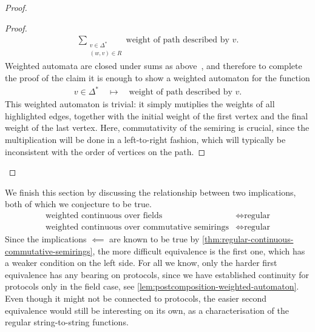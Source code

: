 \begin{proof}
\begin{proof}
\begin{align*}
    \sum_{\substack{v \in \Delta^* \\ (w,v) \in R}} \text{weight of path described by $v$}.
    \end{align*} 
    Weighted automata are closed under sums as above~\cite[Lemma 8.12]{bojanczyk_automata_2025}, and therefore to complete the proof of the claim it is enough to show a weighted automaton for the function
    \begin{align*}
    v \in \Delta^* 
    \quad \mapsto \quad 
    \text{weight of path described by $v$}.
    \end{align*}
    This weighted automaton is trivial: it simply mutiplies the weights of all highlighted edges, together with the initial weight of the first vertex and the final weight of the last vertex. Here, commutativity of the semiring is crucial, since the multiplication will be done in a left-to-right fashion, which will typically be inconsistent with the order of vertices on the path. 
\end{proof}

\end{proof}

We finish this section by discussing the relationship between two implications, both of which we conjecture to be true.
\begin{align}
\text{weighted continuous over fields}
& \iff
\text{regular}
\label{eq:weighted-continuous-fields-again}\\
    \text{weighted continuous over commutative semirings}
& \iff
\text{regular}
\label{eq:weighted-continuous-commutative-semirings-again}
\end{align}
Since the implications $\impliedby$ are known to be true by \cref{thm:regular-continuous-commutative-semirings}, the more difficult equivalence is the first one, which has a weaker condition on the left side. 
For all we know, only the harder  first equivalence has any bearing on protocols, since we have established continuity for protocols only in the field case, see \cref{lem:postcomposition-weighted-automaton}. Even though it might not be connected to protocols, the  easier second equivalence would still be interesting on its own, as a characterisation of the regular string-to-string functions.